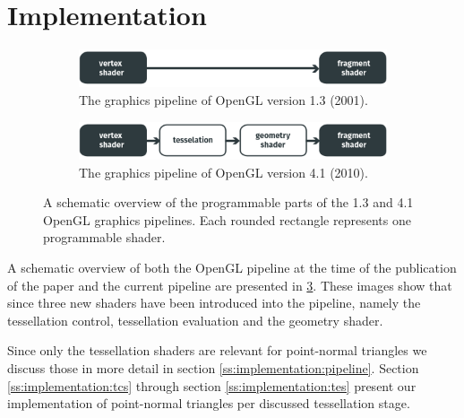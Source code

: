 
\section{Implementation}
\label{s:implementation}

\begin{figure}
	\centering
	\begin{subfigure}{\columnwidth}
		\centering
		\includegraphics[width=\columnwidth]{content/img/implementation/pipeLineOld.png}
		\caption{The graphics pipeline of OpenGL version 1.3 (2001).}
		\label{fig:implementation:pipeline:old}
	\end{subfigure}
	\begin{subfigure}{\columnwidth}
		\centering
		\includegraphics[width=\columnwidth]{content/img/implementation/pipeLineNew.png}
		\caption{The graphics pipeline of OpenGL version 4.1 (2010).}
		\label{fig:implementation:pipeline:new}
	\end{subfigure}	
	\caption{A schematic overview of the programmable parts of the  1.3 and  4.1 OpenGL graphics pipelines. Each rounded rectangle represents one programmable shader.}
	\label{fig:implementation:pipeline}
\end{figure}

A schematic overview of both the OpenGL pipeline at the time of the publication of the paper and the current pipeline are presented in \cref{fig:implementation:pipeline}. These images show that since \citeyear{vlachos2001curved} three new shaders have been introduced into the pipeline, namely the tessellation control, tessellation evaluation and the geometry shader. 

Since only the tessellation shaders are relevant for point-normal triangles we discuss those in more detail in section \ref{ss:implementation:pipeline}. Section \ref{ss:implementation:tcs} through section \ref{ss:implementation:tes} present our implementation of point-normal triangles per discussed tessellation stage. 

